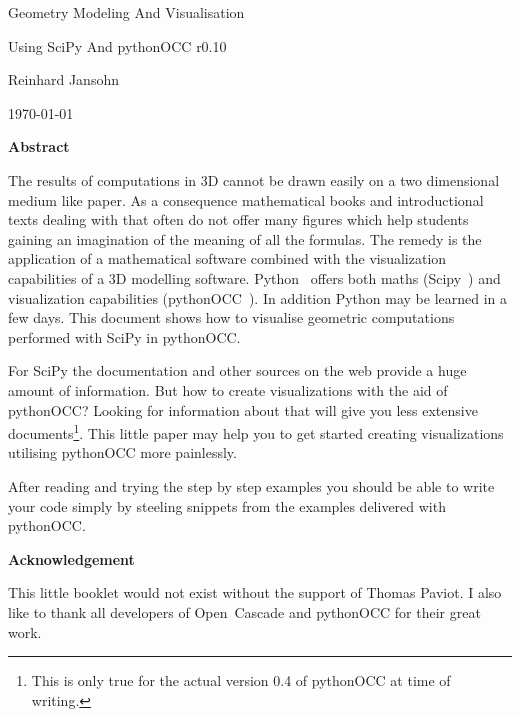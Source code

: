 \documentclass[12pt,a4paper,twoside]{article}
\begin{document}
\begin{titlepage}
\begin{center}
{
\large 
Geometry Modeling And Visualisation 

\vspace*{0.3cm}
Using SciPy And pythonOCC r0.10
}

{

\vspace*{0.75cm}
Reinhard Jansohn

\vspace{0.5cm}
\today
}
\end{center}
{

\vspace*{0.75cm}
{\small
\begin{center}
{\bf Abstract}
\end{center}
The results of computations in 3D cannot be drawn easily on a two dimensional medium like paper.
As a consequence mathematical books and introductional texts dealing with that often do not offer many figures which help students gaining an imagination of the meaning of all the formulas.
The remedy is the application of a mathematical software combined with the visualization capabilities of a 3D modelling software.
Python~\cite{PYTHON_ORG} offers both maths (Scipy~\cite{SCIPY_ORG}) and visualization capabilities (pythonOCC~\cite{PYTHONOCC_ORG}). 
In addition Python may be learned in a few days.
This document shows how to visualise geometric computations performed with SciPy in pythonOCC.

For SciPy the documentation and other sources on the web provide a huge amount of information.
But how to create visualizations with the aid of pythonOCC? 
Looking for information about that will give you less extensive documents\footnote{This is only true for the actual version 0.4 of pythonOCC at time of writing.}.
This little paper may help you to get started creating visualizations utilising pythonOCC more painlessly.

After reading and trying the step by step examples you should be able to write your code simply by steeling snippets from the examples delivered with pythonOCC.

\begin{center}
{\bf Acknowledgement}
\end{center}
This little booklet would not exist without the support of Thomas Paviot. I also like to thank all developers of Open~Cascade and pythonOCC for their great work.
}
}
\end{titlepage}





%
\appendix


\end{document}

